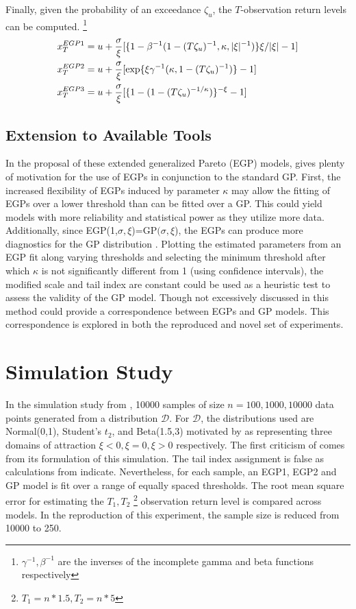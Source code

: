 \documentclass[12pt]{article}
\theoremstyle{definition}
\theoremstyle{definition}
\begin{document}
Finally, given the probability of an exceedance $\zeta_u$, the $T$-observation return levels can be computed. \footnote{$\gamma^{-1}, \beta^{-1}$ are the inverses of the incomplete gamma and beta functions respectively}
\begin{align*}
    x_T^{EGP1}&= u + \frac{\sigma}{\xi} [\{1-\beta^{-1}(1-(T\zeta_u)^{-1},\kappa, |\xi|^{-1})\}{\-\xi/|\xi|}-1]\\
    x_T^{EGP2}&= u + \frac{\sigma}{\xi} [\exp\{\xi\gamma^{-1}(\kappa,1-(T\zeta_u)^{-1})\}-1]\\
    x_T^{EGP3}&= u + \frac{\sigma}{\xi}[\{1-(1-(T\zeta_u)^{-1/\kappa})\}^{-\xi}-1]
\end{align*}

\subsection{Extension to Available Tools }
In the proposal of these extended generalized Pareto (EGP) models, \cite{papatawn} gives plenty of motivation for the use of EGPs in conjunction to the standard GP. First, the increased flexibility of EGPs induced by parameter $\kappa$ may allow the fitting of EGPs over a lower threshold than can be fitted over a GP. This could yield models with more reliability and statistical power as they utilize more data. Additionally, since EGP(1,$\sigma,\xi$)=GP$(\sigma,\xi$), the EGPs can produce more diagnostics for the GP distribution \cite{papatawn}. Plotting the estimated parameters from an EGP fit along varying thresholds and selecting the minimum threshold after which $\kappa$ is not significantly different from 1 (using confidence intervals), the modified scale and tail index are constant could be used as a heuristic test to assess the validity of the GP model. Though not excessively discussed in \cite{papatawn} this method could provide a correspondence between EGPs and GP models. This correspondence is explored in both the reproduced and novel set of experiments.


\section{Simulation Study}
In the simulation study from \cite{papatawn}, 10000 samples of size $n=100,1000, 10000$ data points generated from a distribution $\mathcal{D}$. For $\mathcal{D}$, the distributions used are Normal(0,1), Student's $t_2$, and Beta(1.5,3) motivated by \cite{papatawn} as representing three domains of attraction $\xi<0, \xi=0, \xi>0$ respectively. The first criticism of \cite{papatawn} comes from its formulation of this simulation. The tail index assignment is false as calculations from \cite{index} indicate. Nevertheless, for each sample, an EGP1, EGP2 and GP model is fit over a range of equally spaced thresholds. The root mean square error for estimating the $T_1, T_2$ \footnote{$T_1=n*1.5 , T_2=n*5$} observation return level is compared across models. In the reproduction of this experiment, the sample size is reduced from 10000 to 250. 
\end{document}
